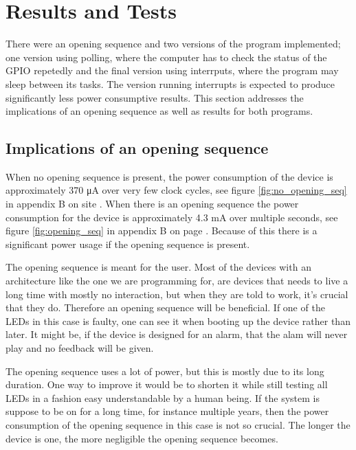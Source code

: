 \section{Results and Tests}

There were an opening sequence and two versions of the program implemented; one version using polling, where the computer has to check the status of the GPIO repetedly and the final version using interrputs, where the program may sleep between its tasks. The version running interrupts is expected to produce significantly less power consumptive results. This section addresses the implications of an opening sequence as well as results for both programs.

\subsection{Implications of an opening sequence}

When no opening sequence is present, the power consumption of the device is approximately 370 \si{\micro\ampere} over very few clock cycles, see figure \ref{fig:no_opening_seq} in appendix B on site \pageref{fig:no_opening_seq}. When there is an opening sequence the power consumption for the device is approximately 4.3 \si{\milli\ampere} over multiple seconds, see figure \ref{fig:opening_seq} in appendix B on page \pageref{fig:opening_seq}. Because of this there is a significant power usage if the opening sequence is present.

The opening sequence is meant for the user. Most of the devices with an architecture like the one we are programming for, are devices that needs to live a long time with mostly no interaction, but when they are told to work, it's crucial that they do. Therefore an opening sequence will be beneficial. If one of the LEDs in this case is faulty, one can see it when booting up the device rather than later. It might be, if the device is designed for an alarm, that the alam will never play and no feedback will be given.

The opening sequence uses a lot of power, but this is mostly due to its long duration. One way to improve it would be to shorten it while still testing all LEDs in a fashion easy understandable by a human being. If the system is suppose to be on for a long time, for instance multiple years, then the power consumption of the opening sequence in this case is not so crucial. The longer the device is one, the more negligible the opening sequence becomes.

